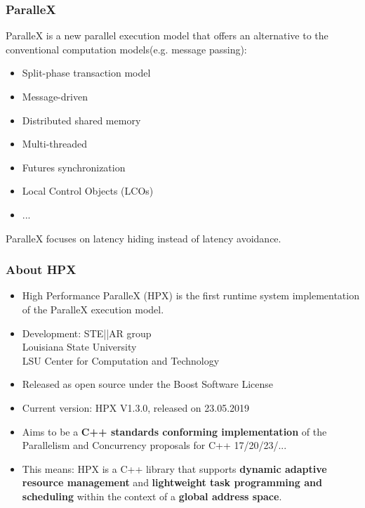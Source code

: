 \begin{frame}
\frametitle{ParalleX}
ParalleX is a new parallel execution model that offers an alternative to the conventional computation models(e.g. message passing):
\begin{itemize}
  \item Split-phase transaction model
  \item Message-driven
  \item Distributed shared memory
  \item Multi-threaded
  \item Futures synchronization
  \item Local Control Objects (LCOs)
  \item ...
\end{itemize}
ParalleX focuses on latency hiding instead of latency avoidance.
\end{frame}

\begin{frame}
\frametitle{About HPX}
\begin{itemize}
  \item High Performance ParalleX (HPX) is the first runtime system implementation of the ParalleX execution model.
  \item Development: STE||AR group \\ Louisiana State University \\ LSU Center for Computation and Technology
  \item Released as open source under the Boost Software License
  \item Current version: HPX V1.3.0, released on 23.05.2019
  \item Aims to be a \textbf{C++ standards conforming implementation} of the Parallelism and Concurrency proposals for C++ 17/20/23/...
  \item This means: HPX is a C++ library that supports \textbf{dynamic adaptive resource management} and \textbf{lightweight task programming and scheduling} within the context of a \textbf{global address space}. 
\end{itemize}
\end{frame}

